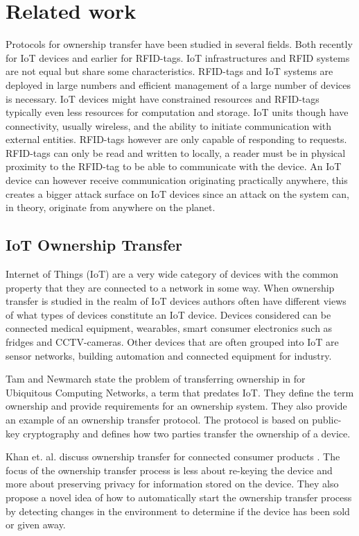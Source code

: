 {\section{Related work}
\label{sec:ot:RelatedWork}

Protocols for ownership transfer have been studied in several fields. Both recently for IoT devices and earlier for RFID-tags. IoT infrastructures and RFID systems are not equal but share some characteristics. RFID-tags and IoT systems are deployed in large numbers and efficient management of a large number of devices is necessary. IoT devices might have constrained resources and RFID-tags typically even less resources for computation and storage. IoT units though have connectivity, usually wireless, and the ability to initiate communication with external entities. RFID-tags however are only capable of responding to requests.
RFID-tags can only be read and written to locally, a reader must be in physical proximity to the RFID-tag to be able to communicate with the device. An IoT device can however receive communication originating practically anywhere, this creates a bigger attack surface on IoT devices since an attack on the system can, in theory, originate from anywhere on the planet.

\subsection{IoT Ownership Transfer}
Internet of Things (IoT) are a very wide category of devices with the common property that they are connected to a network in some way. When ownership transfer is studied in the realm of IoT devices authors often have different views of what types of devices constitute an IoT device. Devices considered can be connected medical equipment, wearables, smart consumer electronics such as fridges and CCTV-cameras. Other devices that are often grouped into IoT are sensor networks, building automation and connected equipment for industry. 

Tam and Newmarch state the problem of transferring ownership in  \cite{tam2004protocol} for Ubiquitous Computing Networks, a term that predates IoT. They define the term ownership and provide requirements for an ownership system. They also provide an example of an ownership transfer protocol. The protocol is based on public-key cryptography and defines how two parties transfer the ownership of a device. 

Khan et. al. discuss ownership transfer for connected consumer products \cite{Khan2019}. The focus of the ownership transfer process is less about re-keying the device and more about preserving privacy for information stored on the device. They also propose a novel idea of  how to automatically start the ownership transfer process by detecting changes in the environment to determine if the device has been sold or given away. 

}
